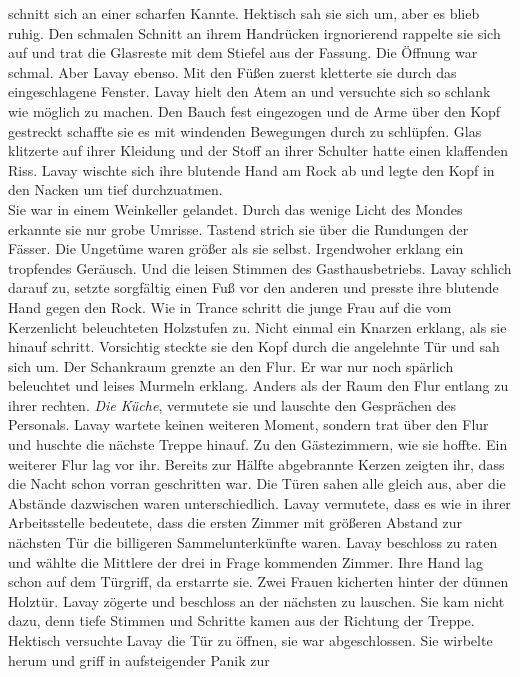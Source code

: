 schnitt sich an einer scharfen Kannte. Hektisch sah sie sich um, aber es blieb ruhig. Den schmalen 
Schnitt an ihrem Handrücken irgnorierend rappelte sie sich auf und trat die Glasreste mit dem 
Stiefel aus der Fassung. Die Öffnung war schmal. Aber Lavay ebenso.
Mit den Füßen zuerst kletterte sie durch das eingeschlagene Fenster. Lavay hielt den Atem an und 
versuchte sich so schlank wie möglich zu machen. Den Bauch fest eingezogen und de Arme über den 
Kopf gestreckt schaffte sie es mit windenden Bewegungen durch zu schlüpfen. Glas klitzerte auf 
ihrer Kleidung und der Stoff an ihrer Schulter hatte einen klaffenden Riss. Lavay wischte sich ihre 
blutende Hand am Rock ab und legte den Kopf in den Nacken um tief durchzuatmen.\\
Sie war in einem Weinkeller gelandet. Durch das wenige Licht des Mondes erkannte sie nur grobe 
Umrisse. Tastend strich sie über die Rundungen der Fässer. Die Ungetüme waren größer als sie 
selbst. Irgendwoher erklang ein tropfendes Geräusch. Und die leisen Stimmen des Gasthausbetriebs. 
Lavay schlich darauf zu, setzte sorgfältig einen Fuß vor den anderen und presste ihre blutende 
Hand gegen den Rock. Wie in Trance schritt die junge Frau auf die vom Kerzenlicht beleuchteten 
Holzstufen zu. Nicht einmal ein Knarzen erklang, als sie hinauf schritt. Vorsichtig steckte sie den 
Kopf durch die angelehnte Tür und sah sich um. Der Schankraum grenzte an den Flur. Er war nur noch 
spärlich beleuchtet und leises Murmeln erklang. Anders als der Raum den Flur entlang zu ihrer 
rechten. \textit{Die Küche}, vermutete sie und lauschte den Gesprächen des Personals. Lavay wartete 
keinen weiteren Moment, sondern trat über den Flur und huschte die nächste Treppe hinauf. Zu den 
Gästezimmern, wie sie hoffte. Ein weiterer Flur lag vor ihr. Bereits zur Hälfte abgebrannte Kerzen 
zeigten ihr, dass die Nacht schon vorran geschritten war. Die Türen sahen alle gleich aus, aber die 
Abstände dazwischen waren unterschiedlich. Lavay vermutete, dass es wie in ihrer Arbeitsstelle 
bedeutete, dass die ersten Zimmer mit größeren Abstand zur nächsten Tür die billigeren 
Sammelunterkünfte waren. Lavay beschloss zu raten und wählte die Mittlere der drei in Frage 
kommenden Zimmer. Ihre Hand lag schon auf dem Türgriff, da erstarrte sie. Zwei Frauen kicherten 
hinter der dünnen Holztür. Lavay zögerte und beschloss an der nächsten zu lauschen. Sie kam nicht 
dazu, denn tiefe Stimmen und Schritte kamen aus der Richtung der Treppe. Hektisch versuchte Lavay 
die Tür zu öffnen, sie war abgeschlossen. Sie wirbelte herum und griff in aufsteigender Panik zur 

